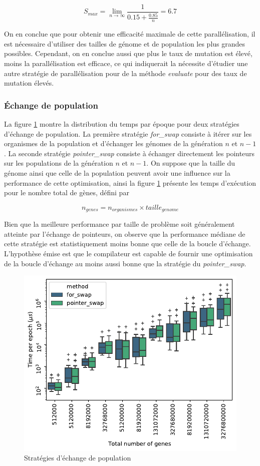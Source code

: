 \documentclass[a4paper, 10pt, twoside]{article}
\begin{document}
$$ S_{max} = \lim_{n\to\infty} \frac{1}{0.15 + \frac{0.85}{n}} = 6.7 $$

On en conclue que pour obtenir une efficacité maximale de cette parallélisation, il est nécessaire d'utiliser des tailles de génome et de population les plus grandes possibles. Cependant, on en conclue aussi que plus le taux de mutation est élevé, moins la parallélisation est efficace, ce qui indiquerait la nécessite d'étudier une autre stratégie de parallélisation pour de la méthode \textit{evaluate} pour des taux de mutation élevés.

\subsubsection{Échange de population}

La figure \ref{fig:swap/strat} montre la distribution du temps par époque pour deux stratégies d'échange de population.
La première stratégie \textit{for\_swap} consiste à itérer sur les organismes de la population et d'échanger les génomes de la génération $n$ et $n-1$.
La seconde stratégie \textit{pointer\_swap} consiste à échanger directement les pointeurs sur les populations de la génération $n$ et $n-1$.
On suppose que la taille du génome ainsi que celle de la population peuvent avoir une influence sur la performance de cette optimisation, ainsi la figure \ref{fig:swap/strat} présente les temps d'exécution pour le nombre total de gènes, défini par

$$ n_{genes} = n_{organismes} \times taille_{genome} $$

Bien que la meilleure performance par taille de problème soit généralement atteinte par l'échange de pointeurs, on observe que la performance médiane de cette stratégie est statistiquement moins bonne que celle de la boucle d'échange.
L'hypothèse émise est que le compilateur est capable de fournir une optimisation de la boucle d'échange au moins aussi bonne que la stratégie du \textit{pointer\_swap}.

\begin{figure}[htbp]
	\centering
	\includegraphics[width=0.6\linewidth]{img/swap_strategies.pdf}
	\caption{Stratégies d'échange de population}
	\label{fig:swap/strat}
\end{figure}
\end{document}
